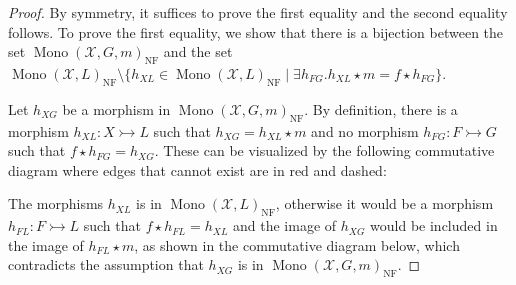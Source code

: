 \begin{proof}
    By symmetry, it suffices to prove the first equality and the second equality follows. To prove the first equality, we show that there is a bijection between the set $\operatorname{Mono}(\mathcal{X},G,m)_{\operatorname{NF}}$ and the set $\operatorname{Mono}(\mathcal{X},L)_{\operatorname{NF}} \setminus \{
                h_{XL} \in \operatorname{Mono}(\mathcal{X},L)_{\operatorname{NF}} \mid 
                \exists h_{FG}. h_{XL} \star m = f \star h_{FG}
            \}$.

    Let $h_{XG}$ be a morphism in $\operatorname{Mono}(\mathcal{X},G,m)_{\operatorname{NF}}$. By definition, there is a morphism $h_{XL}: X \rightarrowtail L$ such that $h_{XG} = h_{XL} \star m$ and no morphism $h_{FG}: F \rightarrowtail G$ such that $f \star h_{FG} = h_{XG}$. These can be visualized by the following commutative diagram where edges that cannot exist are in red and dashed:

    \begin{center}
    \end{center}


    
    The morphisms $h_{XL}$ is in $\operatorname{Mono}(\mathcal{X},L)_{\operatorname{NF}}$, otherwise it would be a morphism $h_{FL}: F \rightarrowtail L$ such that $f \star h_{FL} = h_{XL}$ and the image of $h_{XG}$ would be included in the image of $h_{FL} \star m$, as shown in the commutative diagram below, which contradicts the assumption that $h_{XG}$ is in $\operatorname{Mono}(\mathcal{X},G,m)_{\operatorname{NF}}$. 


\end{proof}
